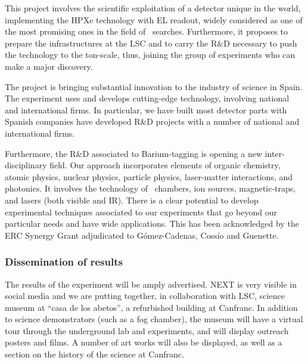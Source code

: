 

This project involves the scientific exploitation of a detector unique in the world, implementing the HPXe technology with EL readout, widely considered as one of the most promising ones in the field of \bbonu\ searches. Furthermore, it proposes to prepare the infrastructures at the LSC and to carry the R\&D necessary to push the technology to the ton-scale, thus, joining the group of experiments who can make a major discovery. 

\indent

The project is bringing substantial innovation to the industry of science in Spain. The experiment uses and develops cutting-edge technology, involving national and international firms. In particular, we have built most detector parts with Spanish companies have developed R\&D  projects with a number of national and international firms.

\indent

Furthermore, the R\&D associated to Barium-tagging is opening a new inter-disciplinary field. Our approach incorporates elements of organic chemistry, atomic physics, nuclear physics, particle physics, laser-matter interactions, and photonics. It involves the technology of \HPXeEL\ chambers, ion sources, magnetic-traps, and lasers (both visible and IR). There is a clear potential to develop experimental techniques associated to our experiments that go beyond our particular needs and have wide applications. This has been acknowledged by the ERC Synergy Grant adjudicated to G\'omez-Cadenas, Coss\'io and Guenette. 

\subsubsection{Dissemination of results}

\indent
The results of the experiment will be amply advertised. NEXT is very visible in social media and we are putting together, in collaboration with LSC, science museum at ``casa de los abetos'', a refurbished building at Canfranc. In addition to science demonstrators (such as a fog chamber), the museum will have a virtual tour through the underground lab and experiments, and will display outreach posters and films. A number of art works will also be displayed, as well as a section on the history of the science at Canfranc. 

